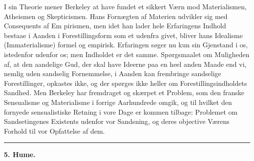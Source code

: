 \documentclass[12pt,a4paper]{book}
\newcommand{\divrule}{\begin{center}\rule{2cm}{0.4pt}\end{center}}
\begin{document}
I sin Theorie mener Berkeley at have fundet et sikkert
Værn mod Materialismen, Atheismen og Skepticismen. Hans
Fornægten af Materien udvikler sig med Consequents af Em\-%
pirismen, men idet han lader hele Erfaringens Indhold bestaae
i Aanden i Forestillingsform som et udenfra givet, bliver hans
Idealisme (Immaterialisme) formel og empirisk. Erfaringen
søger nu kun sin Gjenstand i os, istedenfor udenfor os; men
Indholdet er det samme. Spørgsmaalet om Muligheden af, at
den aandelige Gud, der skal have Ideerne paa en heel anden
Maade end vi, nemlig uden sandselig Fornemmelse, i Aanden
kan frembringe sandselige Forestillinger, opkastes ikke, og der
spørges ikke heller om Forestillingsindholdets Sandhed. Men
Berkeley har fremdraget og skærpet et Problem, som den
franske Sensualisme og Materialisme i forrige Aarhundrede
omgik, og til hvilket den fornyede sensualistiske Retning i
vore Dage er kommen tilbage: Problemet om Sandsetingenes
Existents udenfor vor Sandsning, og deres objective Værens
Forhold til vor Opfattelse af dem.

\divrule

\begin{center}
  \textbf{5. Hume.}
\end{center}

\end{document}
